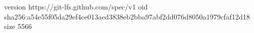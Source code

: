 version https://git-lfs.github.com/spec/v1
oid sha256:a54e55f05da29ef4ce013aed3838eb2bba97abf2dd076d8050a1979cfaf12d18
size 5566
